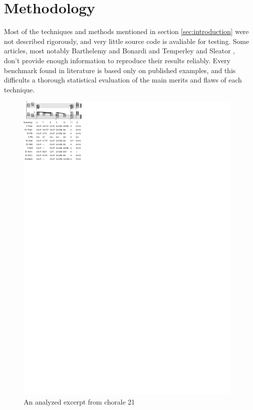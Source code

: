 \documentclass{article}
\begin{document}
\section{Methodology}
\label{sec:methodology}

Most of the techniques and methods mentioned in section
\ref{sec:introduction} were not described rigorously, and very little
source code is avaliable for testing. Some articles, most notably
Barthelemy and Bonardi \cite{barthelemy.ea:figured} and Temperley and
Sleator \cite{temperley.ea:modeling}, don't provide enough information
to reproduce their results reliably. Every benchmark found in
literature \cite{pardo.ea:automated, barthelemy.ea:figured,
  tsui:harmonic, taube:automatic, illescas.ea:harmonic} is based only
on published examples, and this difficults a thorough statistical
evaluation of the main merits and flaws of each technique.

\begin{figure}
  \centering
  \includegraphics[scale=4]{coral-021}
  \caption{An analyzed excerpt from chorale 21}
  \label{fig:coral-021}
\end{figure}
\end{document}
